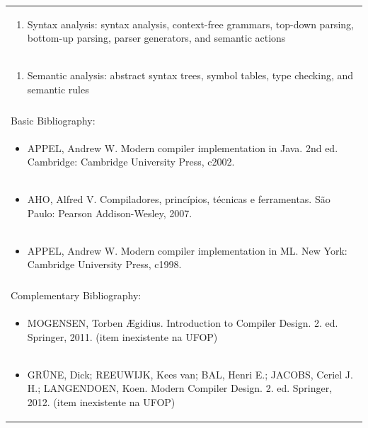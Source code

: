 \documentclass[11pt]{article}
\begin{document}
\begin{center}
\begin{longtable}{|p{4cm}|p{4cm}|p{4cm}|p{4cm}|}
\multicolumn{4}{|p{\dimexpr 16cm + 6\tabcolsep\relax}|}{\begin{enumerate}[start=3]\item Syntax analysis: syntax analysis, context-free grammars, top-down parsing, bottom-up parsing, parser generators, and semantic actions\end{enumerate}}\\
\multicolumn{4}{|p{\dimexpr 16cm + 6\tabcolsep\relax}|}{\begin{enumerate}[start=4]\item Semantic analysis: abstract syntax trees, symbol tables, type checking, and semantic rules\end{enumerate}}\\
\multicolumn{4}{|p{\dimexpr 16cm + 6\tabcolsep\relax}|}{}\\
\hline
\multicolumn{4}{|p{16cm}|}{Basic Bibliography:}\\*
\multicolumn{4}{|p{\dimexpr 16cm + 6\tabcolsep\relax}|}{\begin{itemize}\item APPEL, Andrew W. Modern compiler implementation in Java. 2nd ed. Cambridge: Cambridge University Press, c2002.\end{itemize}}\\
\multicolumn{4}{|p{\dimexpr 16cm + 6\tabcolsep\relax}|}{\begin{itemize}\item AHO, Alfred V. Compiladores, princípios, técnicas e ferramentas. São Paulo: Pearson Addison-Wesley, 2007.\end{itemize}}\\
\multicolumn{4}{|p{\dimexpr 16cm + 6\tabcolsep\relax}|}{\begin{itemize}\item APPEL, Andrew W. Modern compiler implementation in ML. New York: Cambridge University Press, c1998.\end{itemize}}\\
\multicolumn{4}{|p{16cm}|}{}\\
\hline
\multicolumn{4}{|p{16cm}|}{Complementary Bibliography:}\\*
\multicolumn{4}{|p{\dimexpr 16cm + 6\tabcolsep\relax}|}{\begin{itemize}\item MOGENSEN, Torben Ægidius. Introduction to Compiler Design. 2. ed. Springer, 2011. (item inexistente na UFOP)\end{itemize}}\\
\multicolumn{4}{|p{\dimexpr 16cm + 6\tabcolsep\relax}|}{\begin{itemize}\item GRÜNE, Dick; REEUWIJK, Kees van; BAL, Henri E.; JACOBS, Ceriel J. H.; LANGENDOEN, Koen. Modern Compiler Design. 2. ed. Springer, 2012. (item inexistente na UFOP)\end{itemize}}\\

\end{longtable}
\end{center}
\end{document}
